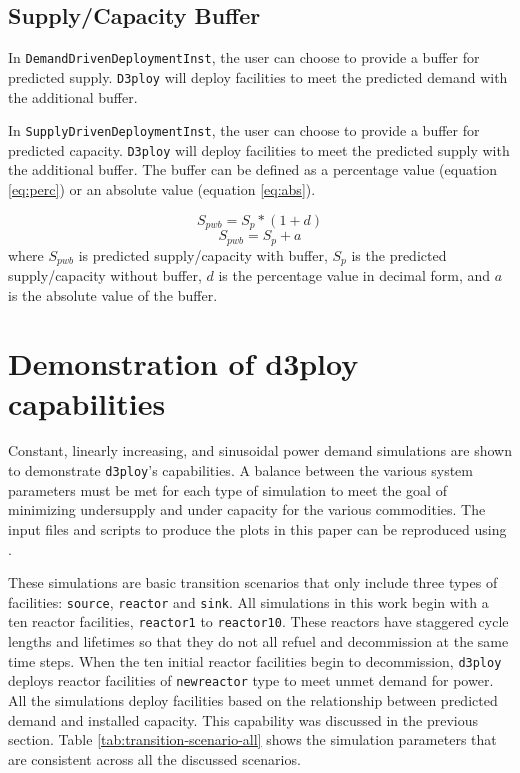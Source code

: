\documentclass{anstrans}
\newcommand{\deploy}{\texttt{d3ploy}\xspace}%
\newcommand{\Deploy}{\texttt{D3ploy}\xspace}%
\begin{document}
\subsection{\textbf{Supply/Capacity Buffer}}
In \texttt{DemandDrivenDeploymentInst}, the user can choose to provide a
buffer for predicted supply.
\Deploy will deploy facilities to meet the predicted demand with the 
additional buffer. 

In \texttt{SupplyDrivenDeploymentInst}, the user can choose to 
provide a buffer for predicted capacity.
\Deploy will deploy facilities to meet the predicted supply with the 
additional buffer. 
The buffer can be defined as a percentage value (equation \ref{eq:perc}) 
or an absolute value (equation \ref{eq:abs}).  

\begin{equation}
    \label{eq:perc}
    S_{pwb} = S_{p}*(1+d)
\end{equation}
\begin{equation}
    \label{eq:abs}
    S_{pwb} = S_{p}+a
\end{equation}
where $S_{pwb}$ is predicted supply/capacity with buffer, 
$S_p$ is the predicted supply/capacity without buffer, 
$d$ is the percentage value in decimal form, 
and $a$ is the absolute value of the buffer. 

\section{Demonstration of d3ploy capabilities}
Constant, linearly increasing, and sinusoidal power demand simulations
are shown to demonstrate \deploy's capabilities. 
A balance between the various system parameters must be 
met for each type of simulation to meet the goal of 
minimizing undersupply and under capacity for the various 
commodities. 
The input files and scripts to produce the plots in this paper 
can be reproduced using \cite{d3ploy_doi_2019}. 

These simulations are basic transition scenarios that only include
three types of facilities: \texttt{source}, \texttt{reactor} and 
\texttt{sink}.
All simulations in this work begin with a ten reactor facilities, 
\texttt{reactor1} to \texttt{reactor10}. 
These reactors have staggered cycle lengths and lifetimes 
so that they do not all refuel and decommission at the same time 
steps. 
When the ten initial reactor facilities begin to decommission, 
\deploy deploys reactor facilities of \texttt{newreactor} type
to meet unmet demand for power. 
All the simulations deploy facilities based on the relationship
between predicted demand and installed capacity. 
This capability was discussed in the previous section.  
Table \ref{tab:transition-scenario-all} shows the simulation 
parameters that are consistent across all the discussed 
scenarios. 
\end{document}
